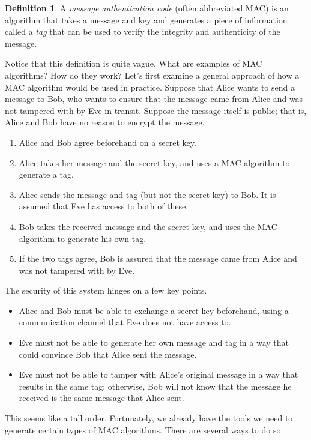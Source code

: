 \documentclass{book}
\theoremstyle{plain}
\theoremstyle{definition}
\newtheorem{definition}[theorem]{Definition}
\begin{document}
\begin{definition}
A {\it message authentication code} (often abbreviated MAC) is an algorithm that takes a message and key and generates a piece of information called a {\it tag} that can be used to verify the integrity and authenticity of the message.
\end{definition}

Notice that this definition is quite vague. What are examples of MAC algorithms? How do they work? Let's first examine a general approach of how a MAC algorithm would be used in practice. Suppose that Alice wants to send a message to Bob, who wants to ensure that the message came from Alice and was not tampered with by Eve in transit. Suppose the message itself is public; that is, Alice and Bob have no reason to encrypt the message.
\begin{enumerate}
\item Alice and Bob agree beforehand on a secret key.
\item Alice takes her message and the secret key, and uses a MAC algorithm to generate a tag.
\item Alice sends the message and tag (but not the secret key) to Bob. It is assumed that Eve has access to both of these.
\item Bob takes the received message and the secret key, and uses the MAC algorithm to generate his own tag.
\item If the two tags agree, Bob is assured that the message came from Alice and was not tampered with by Eve.
\end{enumerate}

The security of this system hinges on a few key points.
\begin{itemize}
\item Alice and Bob must be able to exchange a secret key beforehand, using a communication channel that Eve does not have access to.
\item Eve must not be able to generate her own message and tag in a way that could convince Bob that Alice sent the message.
\item Eve must not be able to tamper with Alice's original message in a way that results in the same tag; otherwise, Bob will not know that the message he received is the same message that Alice sent.
\end{itemize}

This seems like a tall order. Fortunately, we already have the tools we need to generate certain types of MAC algorithms. There are several ways to do so.
\end{document}

